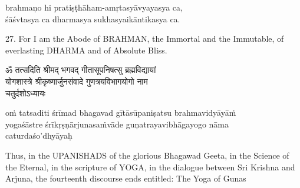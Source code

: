 \begin{transliteration}
brahmaṇo hi pratiṣṭhāham-amṛtasyāvyayasya ca, \\
śāśvtasya ca dharmasya sukhasyaikāntikasya ca.
\end{transliteration}

27. For I am the Abode of BRAHMAN, the Immortal and the Immutable, of
everlasting DHARMA and of Absolute Bliss.

\begin{gitaverse}
ॐ तत्सदिति श्रीमद् भगवद् गीतासूपनिषत्सु ब्रह्मविद्यायां \\
योगशास्त्रे श्रीकृष्णार्जुनसंवादे गुणत्रयविभागयोगो नाम \\
चतुर्दशोऽध्यायः
\end{gitaverse}

\begin{transliteration}
oṁ tatsaditi śrīmad bhagavad gītāsūpaniṣatsu brahmavidyāyāṁ \\
yogaśāstre śrīkṛṣṇārjunasaṁvāde guṇatrayavibhāgayogo nāma \\
caturdaśo'dhyāyaḥ
\end{transliteration}

Thus, in the UPANISHADS of the glorious Bhagawad Geeta, in the Science of the
Eternal, in the scripture of YOGA, in the dialogue between Sri Krishna and
Arjuna, the fourteenth discourse ends entitled: The Yoga of Gunas
